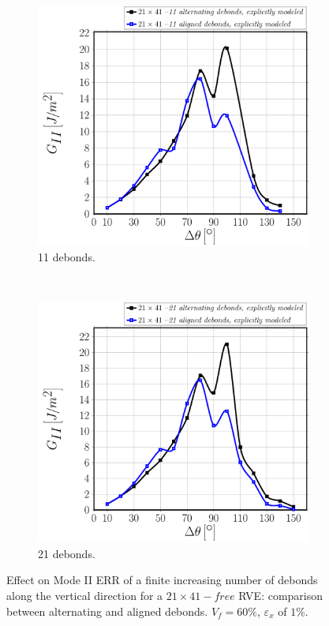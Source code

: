 \documentclass[smallextended]{svjour3}       %
\begin{document}
\begin{figure}[!h]
     \begin{subfigure}[b]{0.475\textwidth}
        \includegraphics[width=\textwidth]{comparison-explicitmodel-11debs-vf60-GII.pdf}
        \caption{11 debonds.}\label{subfig:finitedebscomparisonModeII11debs}
    \end{subfigure} ~
    \begin{subfigure}[b]{0.475\textwidth}
        \includegraphics[width=\textwidth]{comparison-explicitmodel-21debs-vf60-GII.pdf}
        \caption{21 debonds.}\label{subfig:finitedebscomparisonModeII21debs}
    \end{subfigure}

\caption{Effect on Mode II ERR of a finite increasing number of debonds along the vertical direction for a $21\times41-free$ RVE: comparison between alternating and aligned debonds. $V_{f}=60\%$, $\varepsilon_{x}$ of $1\%$.}\label{fig:finitedebscomparisonModeII}
\end{figure}
\end{document}
